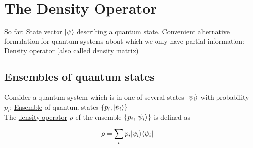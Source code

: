 \section{The Density Operator}
So far: State vector $\lvert\psi\rangle$ describing a quantum state.
Convenient alternative formulation for quantum systems about which we 
only have partial information: \\
\underline{Density operator} (also called density matrix)

\subsection{Ensembles of quantum states}
Consider a quantum system which is in one of several states $\lvert\psi_i\rangle$
with probability $p_i$: \underline{Ensemble} of quantum states
$\{p_i, \lvert\psi_i\rangle \}$ \\
The \underline{density operator} $\rho$ of the ensemble $\{p_i, \lvert\psi_i\rangle \}$
is defined as 

\begin{equation}
    \rho = \sum_i p_i \lvert\psi_i\rangle \langle\psi_i\rvert
\end{equation}

